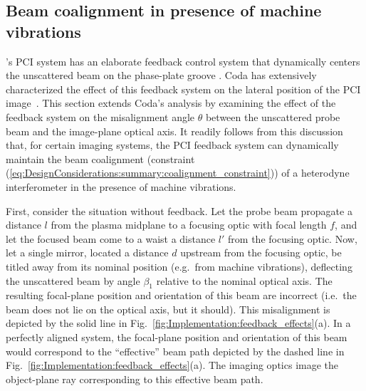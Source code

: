 \subsection{Beam coalignment in presence of machine vibrations}
\label{sec:Implementation:OpticalLayout:coalignment_with_feedback}
\diiid's PCI system has an elaborate feedback control system
that dynamically centers the unscattered beam on the phase-plate groove
\cite[Sec.~3.5]{coda_phd}.
Coda has extensively characterized the effect of this feedback system
on the lateral position of the PCI image~\cite[Sec.~3.5(f)]{coda_phd}.
This section extends Coda's analysis by examining
the effect of the feedback system on the misalignment angle $\theta$
between the unscattered probe beam and the image-plane optical axis.
It readily follows from this discussion that,
for certain imaging systems,
the PCI feedback system can dynamically maintain
the beam coalignment
(constraint (\ref{eq:DesignConsiderations:summary:coalignment_constraint}))
of a heterodyne interferometer in the presence of machine vibrations.

First, consider the situation without feedback.
Let the probe beam propagate a distance $l$
from the plasma midplane to a focusing optic with focal length $f$, and
let the focused beam come to a waist a distance $l'$ from the focusing optic.
Now, let a single mirror,
located a distance $d$ upstream from the focusing optic,
be titled away from its nominal position (e.g.\ from machine vibrations),
deflecting the unscattered beam by angle $\beta_1$
relative to the nominal optical axis.
The resulting focal-plane position and orientation of this beam are incorrect
(i.e.\ the beam does not lie on the optical axis, but it should).
This misalignment is depicted by the solid line in
Fig.~\ref{fig:Implementation:feedback_effects}(a).
In a perfectly aligned system,
the focal-plane position and orientation of this beam
would correspond to the ``effective'' beam path
depicted by the dashed line in
Fig.~\ref{fig:Implementation:feedback_effects}(a).
The imaging optics image the object-plane ray
corresponding to this effective beam path.

